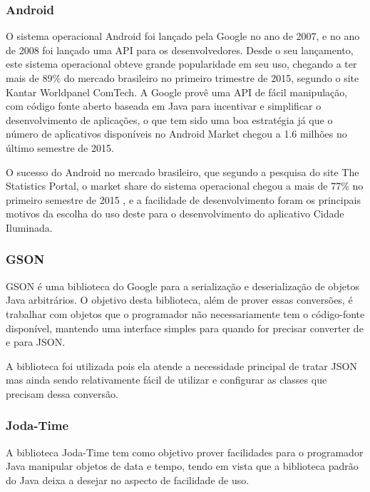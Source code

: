\documentclass[
	article,			%
	11pt,				%
	oneside,			%
	a4paper,			%
	english,			%
	brazil,				%
	sumario=tradicional
	]{abntex2}
\begin{document}
\subsubsection{Android}

O sistema operacional Android foi lançado pela Google no ano de 2007, e no ano de 2008 foi lançado uma API para os desenvolvedores.
Desde o seu lançamento, este sistema operacional obteve grande popularidade em seu uso, chegando a ter mais de 89\% do mercado brasileiro no primeiro trimestre de 2015, segundo o site Kantar Worldpanel ComTech. \cite{comtech}
A Google provê uma API de fácil manipulação, com código fonte aberto baseada em Java para incentivar e simplificar o desenvolvimento de aplicações, o que tem sido uma boa estratégia já que o número de aplicativos disponíveis no Android Market chegou a 1.6 milhões no último semestre de 2015.

O sucesso do Android no mercado brasileiro, que segundo a pesquisa do site The Statistics Portal, o market share do sistema operacional chegou a mais de 77\% no primeiro semestre de 2015 \cite{statista}, e a facilidade de desenvolvimento foram os principais motivos da escolha do uso deste para o desenvolvimento do aplicativo Cidade Iluminada.

\subsubsection{GSON}

GSON é uma biblioteca do Google para a serialização e deserialização de objetos Java arbitrários.
O objetivo desta biblioteca, além de prover essas conversões, é trabalhar com objetos que o programador não necessariamente tem o código-fonte disponível, mantendo uma interface simples para quando for precisar converter de e para JSON. \cite{gson}

A biblioteca foi utilizada pois ela atende a necessidade principal de tratar JSON mas ainda sendo relativamente fácil de utilizar e configurar as classes que precisam dessa conversão.

\subsubsection{Joda-Time}

A biblioteca Joda-Time tem como objetivo prover facilidades para o programador Java manipular objetos de data e tempo, tendo em vista que a biblioteca padrão do Java deixa a desejar no aspecto de facilidade de uso.
\end{document}

